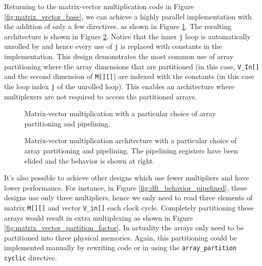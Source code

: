 Returning to the matrix-vector multiplication code in Figure \ref{fig:matrix_vector_base}, we can achieve a highly parallel implementation with the addition of only a few directives, as shown in Figure \ref{fig:matrix_vector_optimized}.  The resulting architecture is shown in Figure \ref{fig:matrix_vector_optimized_behavior}.  Notice that the inner \lstinline|j| loop is automatically unrolled by \VHLS and hence every use of \lstinline|j| is replaced with constants in the implementation.   This design demonstrates the most common use of array partitioning where the array dimensions that are partitioned (in this case, \lstinline|V_In[]| and the second dimension of \lstinline|M[][]|) are indexed with the constants (in this case the loop index \lstinline|j| of the unrolled loop).  This enables an architecture where multiplexers are not required to access the partitioned arrays.

\begin{figure}

\caption{Matrix-vector multiplication with a particular choice of array partitioning and pipelining. }
\label{fig:matrix_vector_optimized}
\end{figure}

\begin{figure}

\caption{Matrix-vector multiplication architecture with a particular choice of array partitioning and pipelining.  The pipelining registers have been elided and the behavior is shown at right.}
\label{fig:matrix_vector_optimized_behavior}
\end{figure}

It's also possible to achieve other designs which use fewer multipliers and have lower performance.   For instance, in Figure \ref{fig:dft_behavior_pipelined}, these designs use only three multipliers, hence we only need to read three elements of matrix \lstinline|M[][]| and vector \lstinline|V_in[]| each clock cycle. Completely partitioning these arrays would result in extra multiplexing as shown in Figure \ref{fig:matrix_vector_partition_factor}.  In actuality the arrays only need to be partitioned into three physical memories.  Again, this partitioning could be implemented manually by rewriting code or in \VHLS using the \lstinline|array_partition cyclic| directive.

